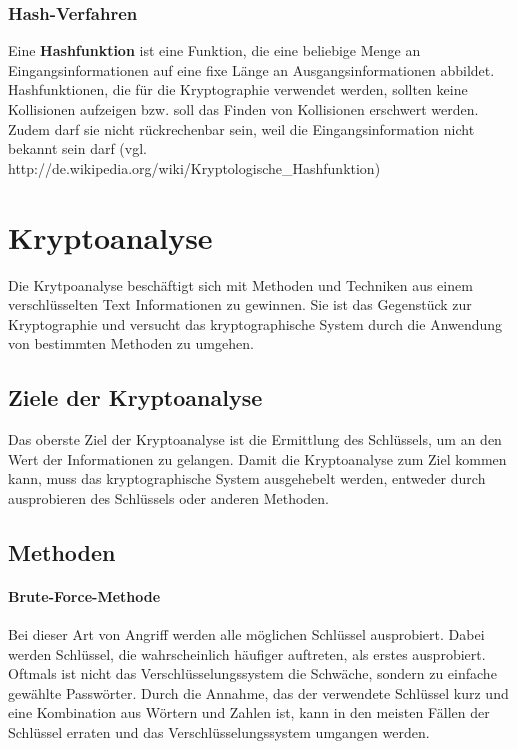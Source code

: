 \documentclass[12pt,a4paper]{report}
\begin{document}
\subsubsection{Hash-Verfahren}

Eine \textbf{Hashfunktion} ist eine Funktion, die eine beliebige Menge an Eingangsinformationen auf eine fixe Länge an Ausgangsinformationen abbildet. Hashfunktionen, die für die Kryptographie verwendet werden, sollten keine Kollisionen aufzeigen bzw. soll das Finden von Kollisionen erschwert werden. Zudem darf sie nicht rückrechenbar sein, weil die Eingangsinformation nicht bekannt sein darf (vgl. http://de.wikipedia.org/wiki/Kryptologische\_Hashfunktion)

\newpage
\section{Kryptoanalyse}

Die Krytpoanalyse beschäftigt sich mit Methoden und Techniken aus einem verschlüsselten Text Informationen zu gewinnen. Sie ist das Gegenstück zur Kryptographie und versucht das kryptographische System durch die Anwendung von bestimmten Methoden zu umgehen.

\subsection{Ziele der Kryptoanalyse}

Das oberste Ziel der Kryptoanalyse ist die Ermittlung des Schlüssels, um an den Wert der Informationen zu gelangen. Damit die Kryptoanalyse zum Ziel kommen kann, muss das kryptographische System ausgehebelt werden, entweder durch ausprobieren des Schlüssels oder anderen Methoden.

\subsection{Methoden}

\paragraph{Brute-Force-Methode} Bei dieser Art von Angriff werden alle möglichen Schlüssel ausprobiert. Dabei werden Schlüssel, die wahrscheinlich häufiger auftreten, als erstes ausprobiert. Oftmals ist nicht das Verschlüsselungssystem die Schwäche, sondern zu einfache gewählte Passwörter. Durch die Annahme, das der verwendete Schlüssel kurz und eine Kombination aus Wörtern und Zahlen ist, kann in den meisten Fällen der Schlüssel erraten und das Verschlüsselungssystem umgangen werden.
\end{document}

